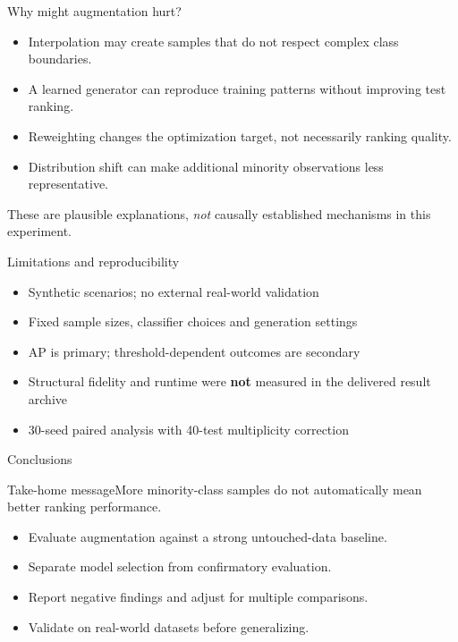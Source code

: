 \documentclass[aspectratio=169,11pt]{beamer}
\begin{document}
	\begin{frame}{Why might augmentation hurt?}\begin{itemize}\setlength\itemsep{0.8em}\item Interpolation may create samples that do not respect complex class boundaries.\item A learned generator can reproduce training patterns without improving test ranking.\item Reweighting changes the optimization target, not necessarily ranking quality.\item Distribution shift can make additional minority observations less representative.\end{itemize}\vspace{0.7em}\footnotesize These are plausible explanations, \emph{not} causally established mechanisms in this experiment.\end{frame}
	\begin{frame}{Limitations and reproducibility}\begin{itemize}\setlength\itemsep{0.65em}\item Synthetic scenarios; no external real-world validation\item Fixed sample sizes, classifier choices and generation settings\item AP is primary; threshold-dependent outcomes are secondary\item Structural fidelity and runtime were \textbf{not} measured in the delivered result archive\item 30-seed paired analysis with 40-test multiplicity correction\end{itemize}\end{frame}
	\begin{frame}{Conclusions}\begin{block}{Take-home message}\large More minority-class samples do not automatically mean better ranking performance.\end{block}\vspace{1em}\begin{itemize}\item Evaluate augmentation against a strong untouched-data baseline.\item Separate model selection from confirmatory evaluation.\item Report negative findings and adjust for multiple comparisons.\item Validate on real-world datasets before generalizing.\end{itemize}\end{frame}
\end{document}
